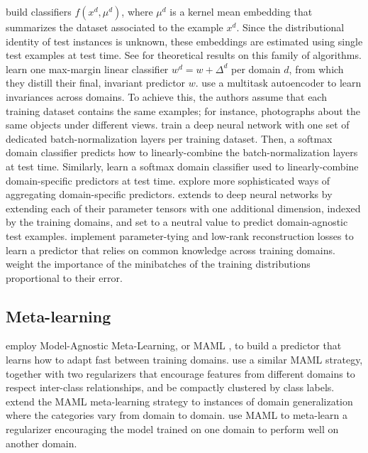 \documentclass{article}
\begin{document}
\citet{blanchard2011generalizing} build classifiers $f(x^d, \mu^d)$, where $\mu^d$ is a kernel mean embedding \citep{muandet2017kernel} that summarizes the dataset associated to the example $x^d$. Since the distributional identity of test instances is unknown, these embeddings are estimated using single test examples at test time. See \citet{blanchard2017domain, deshmukh2019generalization} for theoretical results on this family of algorithms.
\citet{khosla2012undoing} learn one max-margin linear classifier $w^d = w + \Delta^d$ per domain $d$, from which they distill their final, invariant predictor $w$.
\citet{ghifary2015domain} use a multitask autoencoder to learn invariances across domains. To achieve this, the authors assume that each training dataset contains the same examples; for instance, photographs about the same objects under different views.
\citet{mancini2018robust} train a deep neural network with one set of dedicated batch-normalization layers \citep{ioffe2015batch} per training dataset. Then, a softmax domain classifier predicts how to linearly-combine the batch-normalization layers at test time.
Similarly, \citet{mancini2018best} learn a softmax domain classifier used to linearly-combine domain-specific predictors at test time.
\citet{d2018domain} explore more sophisticated ways of aggregating domain-specific predictors. 
\citet{Li_2017_ICCV} extends \citet{khosla2012undoing} to deep neural networks by extending each of their parameter tensors with one additional dimension, indexed by the training domains, and set to a neutral value to predict domain-agnostic test examples.
\citet{ding2017deep} implement parameter-tying and low-rank reconstruction losses to learn a predictor that relies on common knowledge across training domains.
\citet{hu2016does, sagawa2019distributionally} weight the importance of the minibatches of the training distributions proportional to their error.

\subsection{Meta-learning}

\citet{li2018learning} employ Model-Agnostic Meta-Learning, or MAML \citep{finn2017model}, to build a predictor that learns how to adapt fast between training domains.
\citet{dou2019domain} use a similar MAML strategy, together with two regularizers that encourage  features from different domains to respect inter-class relationships, and be compactly clustered by class labels.
\citet{li2019feature} extend the MAML meta-learning strategy to instances of domain generalization where the categories vary from domain to domain.
\citet{balaji2018metareg} use MAML to meta-learn a regularizer encouraging the model trained on one domain to perform well on another domain.
\end{document}
